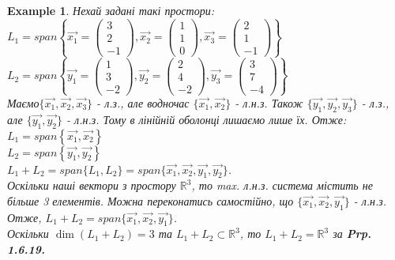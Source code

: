 \documentclass[a4paper, 10pt]{article}
\theoremstyle{theoremdd}
\theoremstyle{theoremdd}
\theoremstyle{theoremdd}
\theoremstyle{theoremdd}
\newtheorem{example}[theorem]{Example}
\theoremstyle{theoremdd}
\theoremstyle{theoremdd}
\theoremstyle{theoremdd}
\theoremstyle{theoremdd}
\begin{document}
	\begin{example}
	Нехай задані такі простори: \\ 
	$L_1 = span\left\{ \vec{x_1} = \begin{pmatrix} 3 \\ 2 \\ -1 \end{pmatrix}, \vec{x_2} = \begin{pmatrix} 1 \\ 1 \\ 0 \end{pmatrix}, \vec{x_3} = \begin{pmatrix} 2 \\ 1 \\ -1 \end{pmatrix}	 \right\}$\\
	$L_2 = span\left\{ \vec{y_1} = \begin{pmatrix} 1 \\ 3 \\ -2 \end{pmatrix}, \vec{y_2} = \begin{pmatrix} 2 \\ 4 \\ -2 \end{pmatrix}, \vec{y_3} = \begin{pmatrix} 3 \\ 7 \\ -4 \end{pmatrix}	 \right\}$\\
	Маємо$\{\vec{x_1}, \vec{x_2}, \vec{x_3}\}$ - л.з., але водночас $\{\vec{x_1},\vec{x_2}\}$ - л.н.з. Також $\{\vec{y_1},\vec{y_2},\vec{y_3}\}$ - л.з., але $\{\vec{y_1},\vec{y_2}\}$ - л.н.з. Тому в лінійній оболонці лишаємо лише їх. Отже: \\
	$L_1 = span\left\{ \vec{x_1}, \vec{x_2} \right\}$\\
	$L_2 = span\left\{ \vec{y_1}, \vec{y_2} \right\}$
	\bigskip \\
	$L_1 + L_2 = span\{L_1, L_2\} = span\{\vec{x_1}, \vec{x_2}, \vec{y_1}, \vec{y_2}\}$.\\
	Оскільки наші вектори з простору $\mathbb{R}^3$, то max. л.н.з. система містить не більше 3 елементів. Можна переконатись самостійно, що $\{\vec{x_1}, \vec{x_2}, \vec{y_1}\}$ - л.н.з. Отже, $L_1 + L_2 = span\{\vec{x_1}, \vec{x_2}, \vec{y_1} \}$.\\
	Оскільки $\dim (L_1 + L_2) = 3$ та $L_1 + L_2 \subset \mathbb{R}^3$, то $L_1+L_2= \mathbb{R}^3$ за \textbf{Prp. 1.6.19.}
	\bigskip \\

\end{example}
\end{document}
